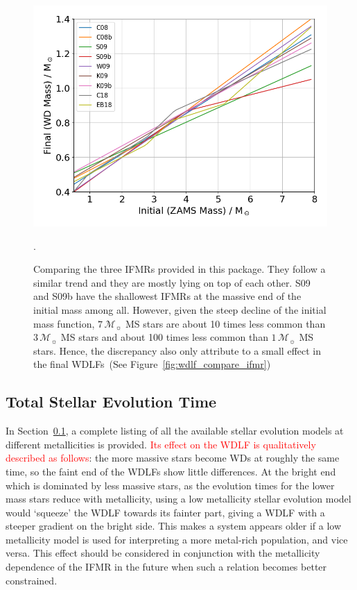 \documentclass[fleqn,usenatbib]{rasti}
\newcommand{\msun}{\mathcal{M}_{\sun}}
\begin{document}
\begin{figure}
    \centering
    \includegraphics[width=\columnwidth]{fig_06_ifmrs.png}
    \caption{Comparing the three IFMRs provided in this package. They follow
    a similar trend and they are mostly lying on top of each other. S09 and S09b
    have the shallowest IFMRs at the massive end of the initial mass among all.
    However, given the steep decline of the initial mass function, $7\,\msun$
    MS stars are about 10 times less common than $3\,\msun$ MS stars and about
    100 times less common than $1\,\msun$ MS stars. Hence, the discrepancy also
    only attribute to a small effect in the final WDLFs~(See
    Figure~\ref{fig:wdlf_compare_ifmr})}.
    \label{fig:ifmrs}
\end{figure}









\subsection{Total Stellar Evolution Time}
\label{sec:evolution_time}
In Section~\ref{sec:evolution_time}, a complete listing of all the available
stellar evolution models at different metallicities is provided. \textcolor{red}{Its effect on
the WDLF is qualitatively described as follows}: the more
massive stars become WDs at roughly the same time, so the faint end of the
WDLFs show little differences. At the bright end which is dominated by less
massive stars, as the evolution times for the lower mass stars reduce with
metallicity, using a low metallicity stellar evolution model would `squeeze'
the WDLF towards its fainter part, giving a WDLF with a steeper gradient on
the bright side. This makes a system appears older if a low metallicity
model is used for interpreting a more metal-rich population, and vice versa.
This effect should be considered in conjunction with the metallicity
dependence of the IFMR in the future when such a relation becomes better
constrained.
\end{document}
